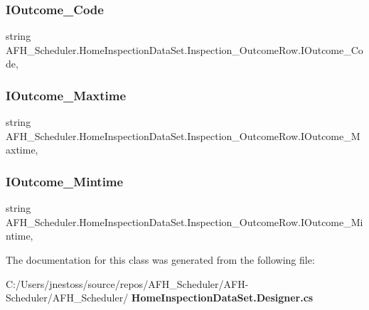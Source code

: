 \subsubsection{IOutcome\_Code}
{\footnotesize\ttfamily string A\+F\+H\+\_\+\+Scheduler.\+Home\+Inspection\+Data\+Set.\+Inspection\+\_\+\+Outcome\+Row.\+I\+Outcome\+\_\+\+Code\hspace{0.3cm}{\ttfamily [get]}, {\ttfamily [set]}}

\mbox{\label{class_a_f_h___scheduler_1_1_home_inspection_data_set_1_1_inspection___outcome_row_aac99d03a5e31d13f2a9127fe9e88af12}} 
\subsubsection{IOutcome\_Maxtime}
{\footnotesize\ttfamily string A\+F\+H\+\_\+\+Scheduler.\+Home\+Inspection\+Data\+Set.\+Inspection\+\_\+\+Outcome\+Row.\+I\+Outcome\+\_\+\+Maxtime\hspace{0.3cm}{\ttfamily [get]}, {\ttfamily [set]}}

\mbox{\label{class_a_f_h___scheduler_1_1_home_inspection_data_set_1_1_inspection___outcome_row_a09774ec183c4097e05713797029a6227}} 
\subsubsection{IOutcome\_Mintime}
{\footnotesize\ttfamily string A\+F\+H\+\_\+\+Scheduler.\+Home\+Inspection\+Data\+Set.\+Inspection\+\_\+\+Outcome\+Row.\+I\+Outcome\+\_\+\+Mintime\hspace{0.3cm}{\ttfamily [get]}, {\ttfamily [set]}}



The documentation for this class was generated from the following file\+:\begin{DoxyCompactItemize}
\item 
C\+:/\+Users/jnestoss/source/repos/\+A\+F\+H\+\_\+\+Scheduler/\+A\+F\+H-\/\+Scheduler/\+A\+F\+H\+\_\+\+Scheduler/\textbf{ Home\+Inspection\+Data\+Set.\+Designer.\+cs}\end{DoxyCompactItemize}
